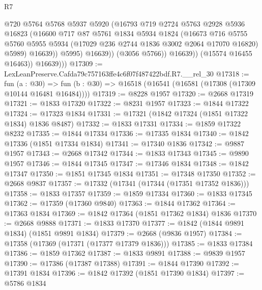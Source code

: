 \begin{lexlean}{R7}
\begin{coremodule}
                        @720
                        @5764
                        @5768
                        @5937
                        @5920
                        (@16793
                          @719
                          @2724
                          @5763
                          @2928
                          @5936
                          @16823
                          (@16600
                            @717
                            @87
                            @5761
                            @1834
                            @5934
                            @1824
                            (@16673
                              @716
                              @5755
                              @5760
                              @5955
                              @5934
                              (@17029 @236 @2744 @1836 @3002 @2064 @17070 @16820)
                              @5989)
                            @16639))
                        @5995)
                      @16639))
                  (@3056 @5766))
                @16639))
            (@15574 @16455 @16463))
          @16639)))
@17309 := LexLeanPreserve.Cafda79c757163ffe4c6f07f487422bdf.R7.__rel_30
@17318 := fun (a : @30) =>
  fun (b : @30) => @16518 (@16541 (@16581 (@17308 (@17309 @10144 @16481 @16484))))
@17319 := @8228 @1957
@17320 := @2668 @17319
@17321 := @1833 @17320
@17322 := @8231 @1957
@17323 := @1844 @17322
@17324 := @17323 @1834
@17331 := @17321 (@1842 @17324 (@1851 @17322 @1834) @1836 @8487)
@17332 := @1833 @17331
@17334 := @1859 @17322 @8232
@17335 := @1844 @17334
@17336 := @17335 @1834
@17340 := @1842 @17336 (@1851 @17334 @1834)
@17341 := @17340 @1836
@17342 := @9887 @1957
@17343 := @2668 @17342
@17344 := @1833 @17343
@17345 := @9890 @1957
@17346 := @1844 @17345
@17347 := @17346 @1834
@17348 := @1842 @17347
@17350 := @1851 @17345 @1834
@17351 := @17348 @17350
@17352 := @2668 @9837
@17357 := @17332 (@17341 (@17344 (@17351 @17352 @1836)))
@17358 := @1833 @17357
@17359 := @1859 @17334
@17360 := @1833 @17345
@17362 := @17359 (@17360 @9840)
@17363 := @1844 @17362
@17364 := @17363 @1834
@17369 := @1842 @17364 (@1851 @17362 @1834) @1836
@17370 := @2668 @9888
@17371 := @1833 @17370
@17377 := @1842 (@1844 @9891 @1834) (@1851 @9891 @1834)
@17379 := @2668 (@9836 @1957)
@17384 := @17358 (@17369 (@17371 (@17377 @17379 @1836)))
@17385 := @1833 @17384
@17386 := @1859 @17362
@17387 := @1833 @9891
@17388 := @9839 @1957
@17390 := @17386 (@17387 @17388)
@17391 := @1844 @17390
@17392 := @17391 @1834
@17396 := @1842 @17392 (@1851 @17390 @1834)
@17397 := @5786 @1834

\end{coremodule}
\end{lexlean}

